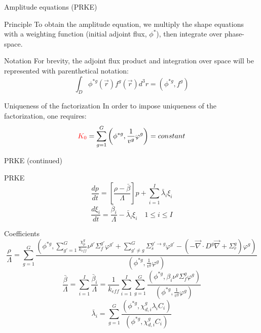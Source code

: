\documentclass[8pt]{beamer}
\renewcommand{\div}{\vec{\nabla}\! \cdot \!}
\newcommand{\grad}{\vec{\nabla}}
\newcommand{\be}{\begin{equation}}
\newcommand{\ee}{\end{equation}}
\newcommand{\tcr}[1]{\textcolor{red}{#1}}
\begin{document}
\begin{frame}{Amplitude equations (PRKE)}

\begin{block}{Principle}
To obtain the amplitude equation, we multiply the shape equations with a weighting 
function (initial adjoint flux, $\phi^*$), then integrate over phase-space.  
\end{block}

\begin{block}{Notation}
For brevity, the adjoint flux product and integration over space will be represented with parenthetical notation:
\be
\int_D\phi^{*g}(\vec{r})f^g(\vec{r})d^3r=\left(\phi^{*g},f^g\right)
\ee
\end{block}


\begin{block}{Uniqueness of the factorization}
In order to impose uniqueness of the factorization, one requires:
\be
\tcr{K_0} = \sum_{g=1}^G\left(\phi^{*g},\frac{1}{v^g}\varphi^g\right)= constant
\ee
\end{block}


\end{frame}

\begin{frame}{PRKE (continued)}

\begin{block}{PRKE}
\be
\frac{dp}{dt}=\left[\frac{\rho-\bar{\beta}}{\Lambda}\right]p+\sum_{i=1}^I\bar{\lambda}_i\xi_i
\ee
\be
\frac{d\xi_i}{dt}=\frac{\bar{\beta}_i}{\Lambda}-\bar{\lambda}_i\xi_i \quad 1 \le i \le I 
\ee
\end{block}

\begin{block}{Coefficients}
\be
\frac{\rho}{\Lambda}=\sum_{g=1}^G\frac{ \left(\phi^{*g},\sum_{g'=1}^G\frac{\chi_p^g}{k_{eff}} \nu^{g'} \Sigma_f^{g'}\varphi^{g'} + \sum_{g'\neq g}^G\Sigma_s^{g'\to g} \varphi^{g'} -\left( -\div D^g \grad  + \Sigma_r^g \right)\varphi^g\right)}{\left(\phi^{*g},\frac{1}{v^g}\varphi^g\right)}
\ee
\be
\frac{\bar{\beta}}{\Lambda}=\sum_{i=1}^I\frac{\bar{\beta}_i}{\Lambda}=\frac{1}{k_{eff}}\sum_{i=1}^I\sum_{g=1}^G\frac{(\phi^{*g}, \beta_i\nu^{g} \Sigma_f^g \varphi^{g})}{\left(\phi^{*g},\frac{1}{v^g}\varphi^g\right)}
\ee
\be
\bar{\lambda}_i=\sum_{g=1}^G\frac{(\phi^{*g},\chi_{d,i}^g\lambda_i C_i)}{(\phi^{*g},\chi_{d,i}^gC_i)}
\ee

\end{block}

\end{frame}
\end{document}
